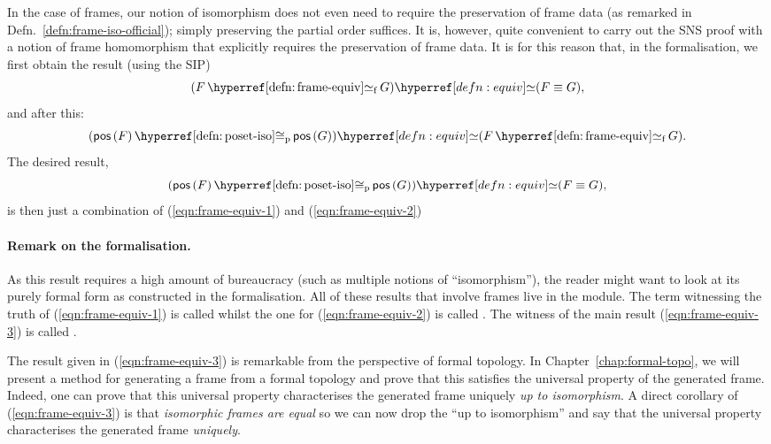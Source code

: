 In the case of frames, our notion of isomorphism does not even need to require the
preservation of frame data (as remarked in Defn.~\ref{defn:frame-iso-official}); simply
preserving the partial order suffices. It is, however, quite convenient to carry out the
SNS proof with a notion of frame homomorphism that explicitly requires the preservation of
frame data. It is for this reason that, in the \veragda{} formalisation, we first obtain
the result (using the SIP)
\begin{equation}\label{eqn:frame-equiv-1}
  \typequiv{(\frameequiv{F}{G})}{(F \equiv G)},
\end{equation}
and after this:
\begin{equation}\label{eqn:frame-equiv-2}
  \typequiv{(\posetiso{\posof{F}}{\posof{G}})}{(\frameequiv{F}{G})}.
\end{equation}
The desired result,
\begin{equation}\label{eqn:frame-equiv-3}
  \typequiv{(\posetiso{\posof{F}}{\posof{G}})}{(F \equiv G)},
\end{equation}
is then just a combination of (\ref{eqn:frame-equiv-1}) and (\ref{eqn:frame-equiv-2})

\paragraph*{Remark on the \veragda{} formalisation.} As this result requires a high amount
of bureaucracy (such as multiple notions of ``isomorphism''), the reader might want to
look at its purely formal form as constructed in the \veragda{} formalisation. All of
these results that involve frames live in the  module. The term witnessing
the truth of (\ref{eqn:frame-equiv-1}) is called  whilst the one for
(\ref{eqn:frame-equiv-2}) is called . The witness of the main result
(\ref{eqn:frame-equiv-3}) is called .

The result given in (\ref{eqn:frame-equiv-3}) is remarkable from the perspective of formal
topology. In Chapter~\ref{chap:formal-topo}, we will present a method for generating a
frame from a formal topology and prove that this satisfies the universal property of the
generated frame. Indeed, one can prove that this universal property characterises the
generated frame uniquely \emph{up to isomorphism}. A direct corollary of
(\ref{eqn:frame-equiv-3}) is that \emph{isomorphic frames are equal} so we can now drop
the ``up to isomorphism'' and say that the universal property characterises the generated
frame \emph{uniquely}.


